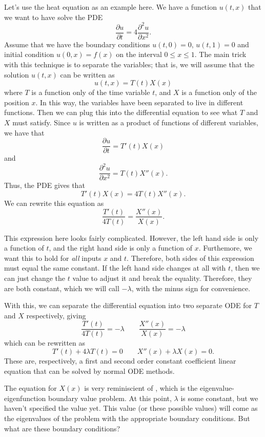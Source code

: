 \documentclass{ximera}
\begin{document}
Let's use the heat equation as an example here. We have a function $u(t,x)$ that we want to have solve the PDE
\[ 
    \frac{\partial u}{\partial t} = 4 \frac{\partial^2u}{\partial x^2}. 
\] 
Assume that we have the boundary conditions $u(t,0) = 0$, $u(t,1) = 0$ and initial condition $u(0, x) = f(x)$ on the interval $0 \leq x \leq 1$. The main trick with this technique is to separate the variables; that is, we will assume that the solution $u(t,x)$ can be written as
\[ 
    u(t,x) = T(t) X(x) 
\] 
where $T$ is a function only of the time variable $t$, and $X$ is a function only of the position $x$. In this way, the variables have been separated to live in different functions. Then we can plug this into the differential equation to see what $T$ and $X$ must satisfy. Since $u$ is written as a product of functions of different variables, we have that
\[ 
    \frac{\partial u}{\partial t} = T'(t)X(x) 
\] 
and 
\[ 
    \frac{\partial^2 u}{\partial x^2} = T(t)X''(x). 
\] 
Thus, the PDE gives that
\[ 
    T'(t)X(x) = 4T(t)X''(x). 
\] 
We can rewrite this equation as
\[ 
    \frac{T'(t)}{4T(t)} = \frac{X''(x)}{X(x)}.
\]

This expression here looks fairly complicated. However, the left hand side is only a function of $t$, and the right hand side is only a function of $x$. Furthemore, we want this to hold for \emph{all} inputs $x$ and $t$. Therefore, both sides of this expression must equal the same constant. If the left hand side changes at all with $t$, then we can just change the $t$ value to adjust it and break the equality. Therefore, they are both constant, which we will call $-\lambda$, with the minus sign for convenience. 

With this, we can separate the differential equation into two separate ODE for $T$ and $X$ respectively, giving
\[ 
    \frac{T'(t)}{4T(t)} = -\lambda \qquad \frac{X''(x)}{X(x)} = -\lambda 
\] 
which can be rewritten as 
\[ 
    T'(t) + 4\lambda T(t) = 0 \qquad X''(x) + \lambda X(x) = 0. 
\] 
These are, respectively, a first and second order constant coefficient linear equation that can be solved by normal ODE methods. 

The equation for $X(x)$ is very reminiscient of , which is the eigenvalue-eigenfunction boundary value problem. At this point, $\lambda$ is some constant, but we haven't specified the value yet. This value (or these possible values) will come as the eigenvalues of the problem with the appropriate boundary conditions. But what are these boundary conditions?
\end{document}
